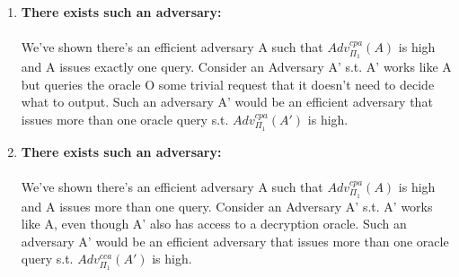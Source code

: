\documentclass[]{article}
\begin{document}
\begin{enumerate}[label=(\alph*)]
	\item  \textbf{There exists such an adversary:}
	\\\\
	We've shown there's an efficient adversary A such that $Adv_{\Pi_1}^{cpa}(A)$ is high and A issues exactly one query. Consider an Adversary A' s.t. A' works like A but queries the oracle O some trivial request that it doesn't need to decide what to output. Such an adversary A' would be an efficient adversary that issues more than one oracle query s.t. $Adv_{\Pi_1}^{cpa}(A')$ is high. 
	\item  \textbf{There exists such an adversary:}
	\\\\
	We've shown there's an efficient adversary A such that $Adv_{\Pi_1}^{cpa}(A)$ is high and A issues more than one query. Consider an Adversary A' s.t. A' works like A, even though A' also has access to a decryption oracle. Such an adversary A' would be an efficient adversary that issues more than one oracle query s.t. $Adv_{\Pi_1}^{cca}(A')$ is high. 
\end{enumerate}
\end{document}
